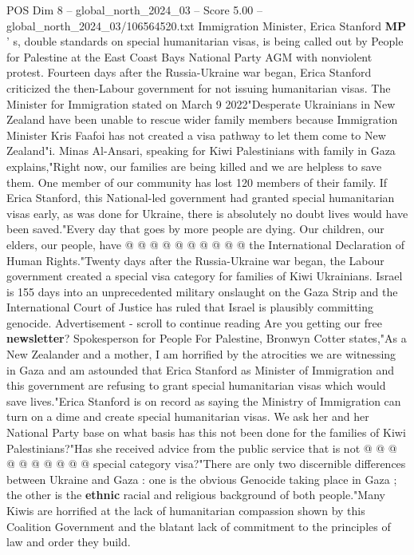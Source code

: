 \begin{textsample}{POS Dim 8 – global\_north\_2024\_03 – Score 5.00 – global\_north\_2024\_03/106564520.txt}  \label{ex:f8_pos_223}
Immigration Minister, Erica Stanford \textbf{MP} ' s, double standards on special humanitarian visas, is being called out by People for Palestine at the East Coast Bays National Party AGM with nonviolent protest.
Fourteen days after the Russia-Ukraine war began, Erica Stanford criticized the then-Labour government for not issuing humanitarian visas.
The Minister for Immigration stated on March 9 2022"Desperate Ukrainians in New Zealand have been unable to rescue wider family members because Immigration Minister Kris Faafoi has not created a visa pathway to let them come to New Zealand"i.
Minas Al-Ansari, speaking for Kiwi Palestinians with family in Gaza explains,"Right now, our families are being killed and we are helpless to save them.
One member of our community has lost 120 members of their family.
If Erica Stanford, this National-led government had granted special humanitarian visas early, as was done for Ukraine, there is absolutely no doubt lives would have been saved."Every day that goes by more people are dying.
Our children, our elders, our people, have @ @ @ @ @ @ @ @ @ @ the International Declaration of Human Rights."Twenty days after the Russia-Ukraine war began, the Labour government created a special visa category for families of Kiwi Ukrainians.
Israel is 155 days into an unprecedented military onslaught on the Gaza Strip and the International Court of Justice has ruled that Israel is plausibly committing genocide.
Advertisement - scroll to continue reading Are you getting our free \textbf{newsletter}?
Spokesperson for People For Palestine, Bronwyn Cotter states,"As a New Zealander and a mother, I am horrified by the atrocities we are witnessing in Gaza and am astounded that Erica Stanford as Minister of Immigration and this government are refusing to grant special humanitarian visas which would save lives."Erica Stanford is on record as saying the Ministry of Immigration can turn on a dime and create special humanitarian visas.
We ask her and her National Party base on what basis has this not been done for the families of Kiwi Palestinians?"Has she received advice from the public service that is not @ @ @ @ @ @ @ @ @ @ special category visa?"There are only two discernible differences between Ukraine and Gaza : one is the obvious Genocide taking place in Gaza ; the other is the \textbf{ethnic} racial and religious background of both people."Many Kiwis are horrified at the lack of humanitarian compassion shown by this Coalition Government and the blatant lack of commitment to the principles of law and order they build.

\end{textsample}
